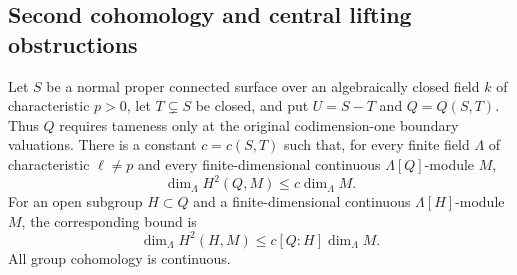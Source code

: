 \subsection{Second cohomology and central lifting obstructions}

\begin{theorem}
\label{D:surface-tame-cross-characteristic-H2}
Let $S$ be a normal proper connected surface over an algebraically
closed field $k$ of characteristic $p>0$, let $T\subsetneq S$ be
closed, and put $U=S-T$ and $Q=Q(S,T)$.  Thus $Q$ requires tameness
only at the original codimension-one boundary valuations.
There is a constant $c=c(S,T)$ such that, for every finite field
$\Lambda$ of characteristic $\ell\ne p$ and every finite-dimensional
continuous $\Lambda[Q]$-module $M$,
\[
          \dim_\Lambda H^2(Q,M)\le c\dim_\Lambda M.       \tag{D.H2.1}
\]
For an open subgroup $H\subset Q$ and a finite-dimensional continuous
$\Lambda[H]$-module $M$, the corresponding bound is
\[
          \dim_\Lambda H^2(H,M)
                \le c[Q:H]\dim_\Lambda M.               \tag{D.H2.2}
\]
All group cohomology is continuous.
\end{theorem}

